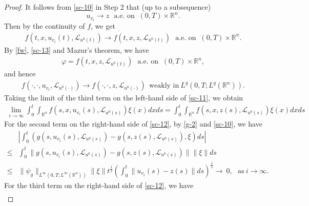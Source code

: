 \documentclass[11pt]{article}
\numberwithin{equation}{section}
\theoremstyle{plain}
\def\leq{\leqslant}
\begin{document}
\begin{proof}
    It follows from \eqref{sc-10} in Step 2 that (up to a subsequence)
    $$u_{v_i}  \rightarrow  z \ \ \   \text{a.e. on }  \ (0,T) \times \mathbb{R}^n.$$
    Then by the continuity of $f$, we get
    \begin{align} \label{sc-13}
        f(t, x, u_{v_i}(t), \mathcal{L}_{u^0(t)} )  \rightarrow  f(t, x, z, \mathcal{L}_{u^0(t)} )\ \ \
        \text{a.e. on } \  (0,T) \times \mathbb{R}^n.
    \end{align}
    By \eqref{fw}, \eqref{sc-13} and Mazur's theorem, we have
    \begin{align} \label{sc-14}
        \varphi = f(t, x, z, \mathcal{L}_{u^0(t)})  \ \ \  \text{a.e. on } \  (0,T) \times \mathbb{R}^n,
    \end{align}
    and hence
    \begin{align} \label{sc-15}
        f(\cdot, \cdot, u_{v_i}, \mathcal{L}_{u^0(\cdot)} ) \rightarrow f(\cdot, \cdot, z, \mathcal{L}_{u^0(\cdot)} )
        \ \  \text{weakly in} \  L^q(0,T; L^q(\mathbb{R}^n) ).
    \end{align}
    Taking the limit
    of the third term on the left-hand side of \eqref{sc-11},
    we obtain
    \begin{align} \label{sc-16}
        \lim_{i \to   \infty} \int_0^t \int_{\mathbb{R}^n} f( s, x, u_{v_i}(s), \mathcal{L}_{u^0(s)}) \xi(x) dx ds
        = \int_0^t \int_{\mathbb{R}^n} f( s, x, z(s), \mathcal{L}_{u^0(s)} ) \xi(x) dx ds
    \end{align}
    For the second term on the right-hand side of \eqref{sc-12},
    by \eqref{g-2} and \eqref{sc-10}, we have
    \begin{align} \label{sc-17}
        &
        \left |
        \int_0^t \left( g(s, u_{v_i}(s), \mathcal{L}_{u^0(s)} ) - g(s, z(s), \mathcal{L}_{u^0(s)} ), \xi \right) ds
        \right |
        \nonumber \\
        \leq & \int_0^t
        \| g(s, u_{v_i}(s), \mathcal{L}_{u^0(s)} ) - g(s, z(s), \mathcal{L}_{u^0(s)} ) \|
        \| \xi \|
        ds  \nonumber \\
        \leq & \| \psi_g \|_{L^\infty(0,T; L^\infty(\mathbb{R}^n) ) }
        \| \xi \|
        t^{\frac{1}{2}}
        \left( \int_0^t
        \| u_{v_i}(s) - z(s) \|
        ds
        \right)^{\frac{1}{2}}
        \rightarrow   \ 0, \ \ \  \text{as} \  i \to  \infty.
    \end{align}
    For the third term on the right-hand side of \eqref{sc-12}, we have
    \begin{align} \label{sc-18}

\end{align}
\end{proof}
\end{document}
